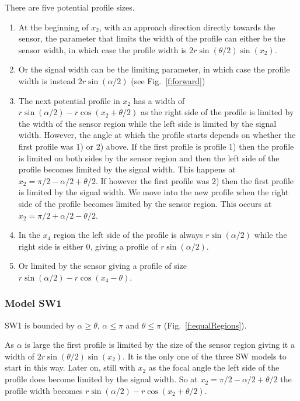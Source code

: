 There are five potential profile sizes. 
\begin{enumerate}
\item At the beginning of $x_2$, with an approach direction directly towards the sensor, the parameter that limits the width of the profile can either be the sensor width,  in which case the profile width is $2r\sin\left(\theta/2\right)\sin(x_2)$. 
\item Or the signal width can be the limiting parameter, in which case the profile width is instead $2r\sin(\alpha /2)$ (see Fig.~\ref{f:forward})
\item The next potential profile in $x_2$ has a width of $r\sin(\alpha/2) - r\cos(x_2 + \theta/2)$ as the right side of the profile is limited by the width of the sensor region while the left side is limited by the signal width. However, the angle at which the profile starts depends on whether the first profile was 1) or 2) above. If the first profile is profile 1) then the profile is limited on both sides by the sensor region and then the left side of the profile becomes limited by the signal width. This happens at $x_2 = \pi/2 - \alpha/2 + \theta/2$. If however the first profile was 2) then the first profile is limited by the signal width. We move into the new profile when the right side of the profile becomes limited by the sensor region. This occurs at $x_2 = \pi/2 + \alpha/2 - \theta/2$.


\item In the $x_4$ region the left side of the profile is always $r\sin(\alpha /2)$ while the right side is either 0, giving a profile of $r\sin(\alpha /2)$. 

\item Or limited by the sensor giving a profile of size $r\sin (\alpha /2) -r\cos(x_4-\theta) $.
\end{enumerate}

\subsubsection{Model SW1} \label{SW1}

SW1 is bounded by $\alpha \ge \theta$, $\alpha \le\pi$ and $\theta \le \pi$ (Fig.~\ref{f:equalRegions}).

As $\alpha $ is large the first profile is limited by the size of the sensor region giving it a width of $2r\sin\left(\theta/2\right)\sin(x_2)$. It is the only one of the three SW models to start in this way. Later on, still with $x_2$ as the focal angle the left side of the profile does become limited by the signal width. So at $x_2= \pi/2 - \alpha/2 + \theta/2$ the profile width becomes $r\sin(\alpha/2) - r\cos(x_2 + \theta/2)$. 

